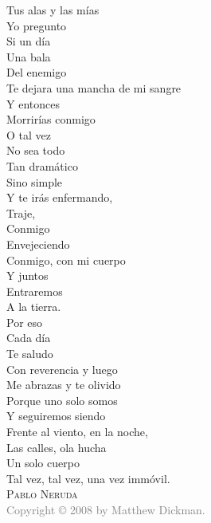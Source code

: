 \documentclass{memoir}
\begin{document}
Tus alas y las mías\\
Yo pregunto\\
Si un día\\
Una bala\\
Del enemigo\\
Te dejara una mancha de mi sangre\\
Y entonces\\
Morrirías conmigo\\
O tal vez\\
No sea todo\\
Tan dramático\\
Sino simple\\
Y te irás enfermando,\\
Traje,\\
Conmigo\\
Envejeciendo\\
Conmigo, con mi cuerpo\\
Y juntos\\
Entraremos\\
A la tierra.\\
Por eso\\
Cada día\\
Te saludo\\
Con reverencia y luego\\
Me abrazas y te olivido\\
Porque uno solo somos\\
Y seguiremos siendo\\
Frente al viento, en la noche,\\
Las calles, ola hucha\\
Un solo cuerpo\\
Tal vez, tal vez, una vez immóvil.\\

\vspace{11pt}
\hspace{80pt} \textsc{Pablo Neruda}\\
\vfill
\noindent\footnotesize{
\textcolor{gray}{Copyright © 2008 by Matthew Dickman.}} %
\end{document}
